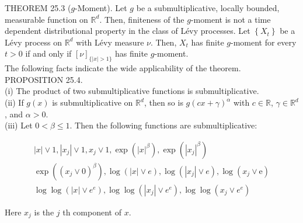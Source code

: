 \documentclass[a4paper,11pt]{article}
\begin{document}
THEOREM 25.3 ($g$-Moment). Let $g$ be a submultiplicative, locally bounded, measurable
function on $\mathbb{R}^{d}$. Then, finiteness of the $g$-moment is not a time dependent
distributional property in the class of Lévy processes. Let $\left\{X_{t}\right\}$ be a Lévy process
on $\mathbb{R}^{d}$ with Lévy measure $\nu$. Then, $X_{t}$ has finite $g$-moment for every $t>0$ if
and only if $[\nu]_{\{|x|>1\}}$ has finite $g$-moment. \\

The following facts indicate the wide applicability of the theorem. \\



PROPOSITION 25.4. \\
(i) The product of two submultiplicative functions is submultiplicative. \\
(ii) If $g(x)$ is submultiplicative on $\mathbb{R}^{d}$, then so is $g(c x+\gamma)^{\alpha}$
with $c \in \mathbb{R}$, $\gamma \in \mathbb{R}^{d}$, and $\alpha>0$. \\
(iii) Let $0<\beta \leq 1$. Then the following functions are submultiplicative:

$$
    \begin{gathered}
        |x| \vee 1,\left|x_{j}\right| \vee 1, x_{j} \vee 1, \exp \left(|x|^{\beta}\right), \exp \left(\left|x_{j}\right|^{\beta}\right) \\
        \exp \left(\left(x_{j} \vee 0\right)^{\beta}\right), \log (|x| \vee e), \log \left(\left|x_{j}\right| \vee e\right), \log \left(x_{j} \vee \mathrm{e}\right) \\
        \log \log \left(|x| \vee e^{e}\right), \log \log \left(\left|x_{j}\right| \vee e^{e}\right), \log \log \left(x_{j} \vee e^{e}\right)
    \end{gathered}
$$

Here $x_{j}$ is the $j$ th component of $x$.
\end{document}

